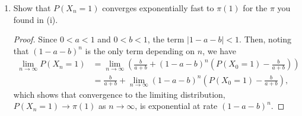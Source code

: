 \documentclass[oneside,reqno]{amsart}
\theoremstyle{definition}
\begin{document}
\begin{enumerate}
\begin{proof}[Proof (by induction on $n$)]
The first base case $n=0$ holds since 
\begin{align*}
	P(X_0 = 1) &= \frac{b}{a+b} + (1-a-b)^0 \left( P(X_0 = 1)- \frac{b}{a+b}\right) \\
					 &= \frac{b}{a+b} + P(X_0 = 1)- \frac{b}{a+b} = P(X_0 = 1),
\end{align*} 
and the second base case $n=1$ holds since
\begin{align*}
	P(X_1 = 1) &= \sum_i P(X_{1} = 1 \mid X_0 = i) P(X_0 = i) \\
					&= P(X_{1} = 1 \mid X_0 = 1) P(X_0 = 1) +  P(X_{1} = 1 \mid X_0 = 2) P(X_0 = 2) \\
					&= (1-a) P(X_0 = 1) +  b (1- P(X_0 = 1) )\\
					&=\frac{b}{a+b} + (1-a-b) \left(P(X_0 = 1)- \frac{b}{a+b}\right)
\end{align*}
where the last equality uses the same logic as in (ii).
\par
Assume the claim is true for any $n$. We want to show that the result is also true for $n+1$. From part (i), we know that 
\[
	P(X_{n+1} = 1) = \frac{b}{a+b} + (1-a-b)\left( P(X_n = 1)- \frac{b}{a+b}\right).
\]
Substituting in for $P(X_n=1)$ gives 
\begin{align*}
	P(X_{n+1} = 1) &= \frac{b}{a+b} + (1-a-b)\left( \left((1-a-b)^n \left(P(X_0 = 1)- \frac{b}{a+b}\right)\right) - \frac{b}{a+b}\right) \\
	&= \frac{b}{a+b} + (1-a-b)^{n+1}\left( P(X_0 = 1)- \frac{b}{a+b}\right).
\end{align*}	
Shifting the indices back one period gives
\[
	P(X_n = 1) = \frac{b}{a+b} + (1-a-b)^n \left( P(X_0 = 1)- \frac{b}{a+b}\right).
\]
\end{proof}

\item
Show that $P(X_n=1)$ converges exponentially fast to $\pi(1)$ for the $\pi$ you found in (i).

\begin{proof}
Since $0<a<1$ and $0<b<1$, the term $|1-a-b| < 1$. Then, noting that $(1-a-b)^n$ is the only term depending on $n$, we have
\begin{align*}
	\lim_{n \to \infty} P(X_n = 1) &= \lim_{n \to \infty}\left( \frac{b}{a+b} + (1-a-b)^n \left(P(X_0 = 1)- \frac{b}{a+b}\right)\right) \\
	&=  \frac{b}{a+b} + \lim_{n \to \infty} (1-a-b)^n  \left( P(X_0 = 1) - \frac{b}{a+b} \right),
\end{align*}
which shows that convergence to the limiting distribution, $P(X_n=1) \to \pi(1)$ as $n \to \infty$, is exponential at rate $(1-a-b)^n$.
\end{proof}
\end{enumerate}
\end{document}
